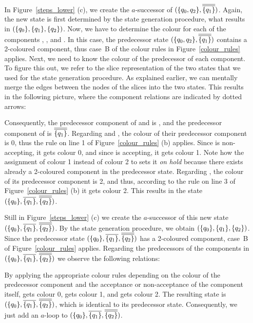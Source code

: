 In Figure~\ref{steps_lower} (c), we create the $a$-successor of $(\qqm02, \cl2{\qm1})$. Again, the new state is first determined by the state generation procedure, what results in $(\{q_{0}\}, \{q_{1}\}, \{q_{2}\})$. Now, we have to determine the colour for each of the components , , and . In this case, the predecessor state $(\qqm02, \cl2{\qm1})$ contains a 2-coloured component, thus case~B of the colour rules in Figure~\ref{colour_rules} applies. Next, we need to know the colour of the predecessor of each component. To figure this out, we refer to the slice representation of the two states that we used for the state generation procedure. As explained earlier, we can mentally merge the edges between the nodes of the slices into the two states. This results in the following picture, where the component relations are indicated by dotted arrows:

\begin{center}
\PredCompsOne
\end{center}

Consequently, the predecessor component of  and  is , and the predecessor component of  is $\cl2{\qm1}$. Regarding  and , the colour of their predecessor component is 0, thus the rule on line 1 of Figure~\ref{colour_rules} (b) applies. Since  is non-accepting, it gets colour 0, and since  is accepting, it gets colour 1. Note how the assignment of colour 1 instead of colour 2 to  sets it \textit{on hold} because there exists already a 2-coloured component in the predecessor state. Regarding , the colour of its predecessor component is 2, and thus, according to the rule on line 3 of Figure~\ref{colour_rules} (b) it gets colour 2. This results in the state $(\qm0, \cl1{\qm1}, \cl2{\qm2})$.

Still in Figure~\ref{steps_lower} (c) we create the $a$-successor of this new state $(\qm0, \cl1{\qm1}, \cl2{\qm2})$. By the state generation procedure, we obtain $(\{q_{0}\}, \{q_{1}\}, \{q_{2}\})$. Since the predecessor state  $(\qm0, \cl1{\qm1}, \cl2{\qm2})$ has a 2-coloured component, case~B of Figure~\ref{colour_rules} applies. Regarding the predecessors of the components in $(\qm0, \cl1{\qm1}, \cl2{\qm2})$ we observe the following relations:

\begin{center}
\PredCompsTwo
\end{center}

By applying the appropriate colour rules depending on the colour of the predecessor component and the acceptance or non-acceptance of the component itself,  gets colour 0,  gets colour 1, and  gets colour 2. The resulting state is $(\qm0, \cl1{\qm1}, \cl2{\qm2})$, which is identical to its predecessor state. Consequently, we just add an $a$-loop to $(\qm0, \cl1{\qm1}, \cl2{\qm2})$.

